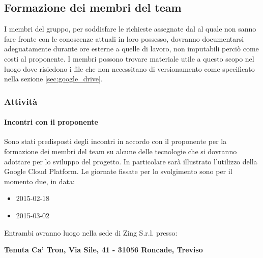 	\subsection{Formazione dei membri del team}
	I membri del gruppo, per soddisfare le richieste assegnate dal \roleProjectManager{} al quale non sanno fare fronte con le conoscenze attuali in loro possesso, dovranno documentarsi adeguatamente durante ore esterne a quelle di lavoro, non imputabili perciò come costi al proponente.\newline
	I membri possono trovare materiale utile a questo scopo nel luogo dove risiedono i file che non necessitano di versionamento come specificato nella sezione \ref{sec:google_drive}.
		\subsubsection{Attività} %
			\paragraph{Incontri con il proponente} %
			\label{par:incontri_con_il_proponente}
			Sono stati predisposti degli incontri in accordo con il proponente per la formazione dei membri del team su alcune delle tecnologie che si dovranno adottare per lo sviluppo del progetto. In particolare sarà illustrato l'utilizzo della Google Cloud Platform. \newline
			Le giornate fissate per lo svolgimento sono per il momento due, in data:
				\begin{itemize}
					\item 2015-02-18
					\item 2015-03-02
				\end{itemize}
			\noindent
			Entrambi avranno luogo nella sede di Zing S.r.l. presso:
			\begin{center}
				\textbf{Tenuta Ca’ Tron, Via Sile, 41 - 31056 Roncade, Treviso}
			\end{center}


